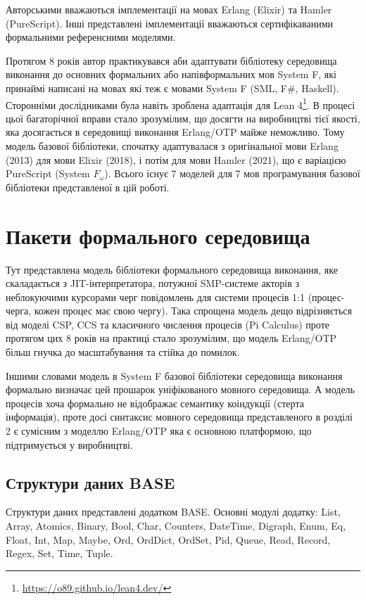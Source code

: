 Авторськими вважаються імплементації на мовах Erlang (Elixir) та Hamler (PureScript).
Інші представлені імплементації вважаються сертифікаваними формальними референсними моделями.

Протягом 8 років автор практикувався аби адаптувати бібліотеку середовища виконання
до основних формальних або напівформальних мов System F, які принаймі написані
на мовах які теж є мовами System F (SML, F\#, Haskell). Сторонніми дослідниками
була навіть зроблена адаптація для Lean 4\footnote{\url{https://o89.github.io/lean4.dev/}}.
В процесі цьої багаторічної вправи стало зрозумілим, що досягти на виробництві
тієї якості, яка досягається в середовищі виконання Erlang/OTP майже неможливо.
Тому модель базової бібліотеки, спочатку адаптувалася з оригінальної мови Erlang (2013)
для мови Elixir (2018), і потім для мови Hamler (2021), що є варіацією PureScript (System $F_\omega$).
Всього існує 7 моделей для 7 мов програмування базової бібліотеки представленої в цій роботі.

\section{Пакети формального середовища}
Тут представлена модель бібліотеки формального середовища виконання, яке
скаладається з JIT-інтерпретатора, потужної SMP-системе акторів з неблокуючими
курсорами черг повідомлень для системи процесів 1:1 (процес-черга, кожен процес
має свою чергу). Така спрощена модель дещо відрізняється від моделі CSP, CCS
та класичного числення процесів (Pi Calculus) проте протягом цих 8 років на практиці
стало зрозумілим, що модель Erlang/OTP більш гнучка до масштабування та стійка до помилок.

Іншими словами модель в System F базової бібліотеки
середовища виконання формально визначає цей прошарок уніфікованого мовного середовища.
А модель процесів хоча формально не відображає семантику коіндукції (стерта інформація),
проте досі синтаксис мовного середовища представленого в розділі 2 є сумісним з моделлю
Erlang/OTP яка є основною платформою, що підтримується у виробництві.

\subsection{Структури даних BASE}
Структури даних представлені додатком BASE. Основні модулі додатку:
List, Array, Atomics, Binary, Bool, Char, Counters, DateTime, Digraph,
Enum, Eq, Float, Int, Map, Maybe, Ord, OrdDict, OrdSet, Pid, Queue,
Read, Record, Regex, Set, Time, Tuple.

